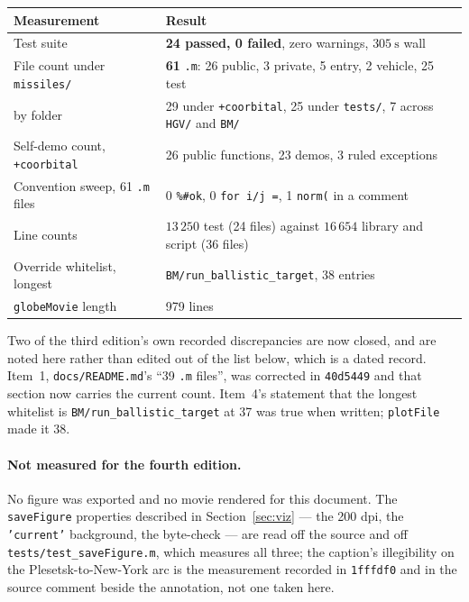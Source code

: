 \documentclass[11pt]{article}
\newcommand{\code}[1]{\texttt{#1}}
\newcommand{\pkg}[1]{\texttt{+#1}}
\begin{document}
\begin{center}
\begin{tabular}{ll}
\toprule
Measurement & Result \\
\midrule
Test suite                             & \textbf{24 passed, 0 failed}, zero warnings, $305~\mathrm{s}$ wall \\
File count under \code{missiles/}      & \textbf{61} \code{.m}: 26 public, 3 private, 5 entry, 2 vehicle, 25 test \\
\quad by folder                        & 29 under \code{+coorbital}, 25 under \code{tests/}, 7 across \code{HGV/} and \code{BM/} \\
Self-demo count, \pkg{coorbital}       & 26 public functions, 23 demos, 3 ruled exceptions \\
Convention sweep, 61 \code{.m} files   & 0 \code{\%\#ok}, 0 \code{for i/j =}, 1 \code{norm(} in a comment \\
Line counts                            & $13\,250$ test (24 files) against $16\,654$ library and script (36 files) \\
Override whitelist, longest            & \code{BM/run\_ballistic\_target}, 38 entries \\
\code{globeMovie} length               & 979 lines \\
\bottomrule
\end{tabular}
\end{center}

Two of the third edition's own recorded discrepancies are now closed, and are
noted here rather than edited out of the list below, which is a dated record.
Item~1, \code{docs/README.md}'s ``39 \code{.m} files'', was corrected in
\code{40d5449} and that section now carries the current count. Item~4's
statement that the longest whitelist is \code{BM/run\_ballistic\_target} at 37
was true when written; \code{plotFile} made it 38.

\paragraph{Not measured for the fourth edition.} No figure was exported and no
movie rendered for this document. The \code{saveFigure} properties described in
Section~\ref{sec:viz} --- the 200 dpi, the \code{'current'} background, the
byte-check --- are read off the source and off
\code{tests/test\_saveFigure.m}, which measures all three; the caption's
illegibility on the Plesetsk-to-New-York arc is the measurement recorded in
\code{1fffdf0} and in the source comment beside the annotation, not one taken
here.
\end{document}
